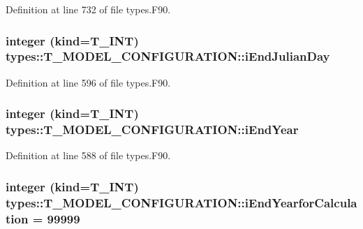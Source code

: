 Definition at line 732 of file types.F90.

\hypertarget{typetypes_1_1_t___m_o_d_e_l___c_o_n_f_i_g_u_r_a_t_i_o_n_a00e60b13d32a2025c8ba50e5e50ccee8}{
\subsubsection[{iEndJulianDay}]{\setlength{\rightskip}{0pt plus 5cm}integer (kind={\bf T\_\-INT}) {\bf types::T\_\-MODEL\_\-CONFIGURATION::iEndJulianDay}}}
\label{typetypes_1_1_t___m_o_d_e_l___c_o_n_f_i_g_u_r_a_t_i_o_n_a00e60b13d32a2025c8ba50e5e50ccee8}


Definition at line 596 of file types.F90.

\hypertarget{typetypes_1_1_t___m_o_d_e_l___c_o_n_f_i_g_u_r_a_t_i_o_n_a82467f5e064c49d1bef630769ab87771}{
\subsubsection[{iEndYear}]{\setlength{\rightskip}{0pt plus 5cm}integer (kind={\bf T\_\-INT}) {\bf types::T\_\-MODEL\_\-CONFIGURATION::iEndYear}}}
\label{typetypes_1_1_t___m_o_d_e_l___c_o_n_f_i_g_u_r_a_t_i_o_n_a82467f5e064c49d1bef630769ab87771}


Definition at line 588 of file types.F90.

\hypertarget{typetypes_1_1_t___m_o_d_e_l___c_o_n_f_i_g_u_r_a_t_i_o_n_afa83738f35facf3b13927fc208f45dee}{
\subsubsection[{iEndYearforCalculation}]{\setlength{\rightskip}{0pt plus 5cm}integer (kind={\bf T\_\-INT}) {\bf types::T\_\-MODEL\_\-CONFIGURATION::iEndYearforCalculation} = 99999}}
\label{typetypes_1_1_t___m_o_d_e_l___c_o_n_f_i_g_u_r_a_t_i_o_n_afa83738f35facf3b13927fc208f45dee}


